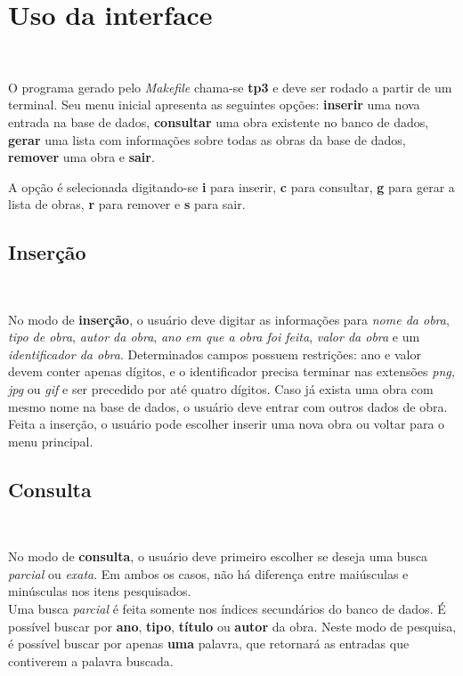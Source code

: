 \documentclass{article}
\begin{document}
\section{Uso da interface}\

O programa gerado pelo \textit{Makefile} chama-se \textbf{tp3} e deve ser rodado a partir de um terminal. Seu menu inicial apresenta as seguintes opções: \textbf{inserir} uma nova entrada na base de dados, \textbf{consultar} uma obra existente no banco de dados, \textbf{gerar} uma lista com informações sobre todas as obras da base de dados, \textbf{remover} uma obra e \textbf{sair}.

A opção é selecionada digitando-se \textbf{i} para inserir, \textbf{c} para consultar, \textbf{g} para gerar a lista de obras, \textbf{r} para remover e \textbf{s} para sair.\\

\subsection{Inserção}\

No modo de \textbf{inserção}, o usuário deve digitar as informações para \textit{nome da obra}, \textit{tipo de obra}, \textit{autor da obra}, \textit{ano em que a obra foi feita}, \textit{valor da obra} e um \textit{identificador da obra}. Determinados campos possuem restrições: ano e valor devem conter apenas dígitos, e o identificador precisa terminar nas extensões \textit{png, jpg} ou \textit{gif} e ser precedido por até quatro dígitos. Caso já exista uma obra com mesmo nome na base de dados, o usuário deve entrar com outros dados de obra. Feita a inserção, o usuário pode escolher inserir uma nova obra ou voltar para o menu principal.\\

\subsection{Consulta}\

No modo de \textbf{consulta}, o usuário deve primeiro escolher se deseja uma busca \textit{parcial} ou \textit{exata}. Em ambos os casos, não há diferença entre maiúsculas e minúsculas nos itens pesquisados.\\

Uma busca \textit{parcial} é feita somente nos índices secundários do banco de dados. É possível buscar por \textbf{ano}, \textbf{tipo}, \textbf{título} ou \textbf{autor} da obra. Neste modo de pesquisa, é possível buscar por apenas \textbf{uma} palavra, que retornará as entradas que contiverem a palavra buscada.\\
\end{document}
